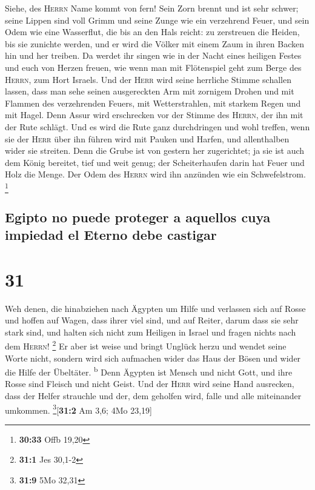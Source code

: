  Siehe, des \textsc{Herrn} Name kommt von fern! Sein Zorn
brennt und ist sehr schwer; seine Lippen sind voll Grimm und seine Zunge
wie ein verzehrend Feuer,  und sein Odem wie eine
Wasserflut, die bis an den Hals reicht: zu zerstreuen die Heiden, bis
sie zunichte werden, und er wird die Völker mit einem Zaum in ihren
Backen hin und her treiben.  Da werdet ihr singen wie in
der Nacht eines heiligen Festes und euch von Herzen freuen, wie wenn man
mit Flötenspiel geht zum Berge des \textsc{Herrn}, zum Hort Israels.
 Und der \textsc{Herr} wird seine herrliche Stimme
schallen lassen, dass man sehe seinen ausgereckten Arm mit zornigem
Drohen und mit Flammen des verzehrenden Feuers, mit Wetterstrahlen, mit
starkem Regen und mit Hagel.  Denn Assur wird erschrecken
vor der Stimme des \textsc{Herrn}, der ihn mit der Rute schlägt.
 Und es wird die Rute ganz durchdringen und wohl treffen,
wenn sie der \textsc{Herr} über ihn führen wird mit Pauken und Harfen,
und allenthalben wider sie streiten.  Denn die Grube ist
von gestern her zugerichtet; ja sie ist auch dem König bereitet, tief
und weit genug; der Scheiterhaufen darin hat Feuer und Holz die Menge.
Der Odem des \textsc{Herrn} wird ihn anzünden wie ein Schwefelstrom.
\footnote{\textbf{30:33} Offb 19,20}

\hypertarget{egipto-no-puede-proteger-a-aquellos-cuya-impiedad-el-eterno-debe-castigar}{%
\subsection{Egipto no puede proteger a aquellos cuya impiedad el Eterno
debe
castigar}\label{egipto-no-puede-proteger-a-aquellos-cuya-impiedad-el-eterno-debe-castigar}}

\hypertarget{section-30}{%
\section{31}\label{section-30}}

 Weh denen, die hinabziehen nach Ägypten um Hilfe und
verlassen sich auf Rosse und hoffen auf Wagen, dass ihrer viel sind, und
auf Reiter, darum dass sie sehr stark sind, und halten sich nicht zum
Heiligen in Israel und fragen nichts nach dem \textsc{Herrn}!
\footnote{\textbf{31:1} Jes 30,1-2}  Er aber ist weise und
bringt Unglück herzu und wendet seine Worte nicht, sondern wird sich
aufmachen wider das Haus der Bösen und wider die Hilfe der Übeltäter.
\textsuperscript{b}  Denn Ägypten ist Mensch und nicht
Gott, und ihre Rosse sind Fleisch und nicht Geist. Und der \textsc{Herr}
wird seine Hand ausrecken, dass der Helfer strauchle und der, dem
geholfen wird, falle und alle miteinander umkommen.
\footnote{\textbf{31:9} 5Mo 32,31}{[}\textbf{31:2} Am 3,6; 4Mo 23,19{]}

